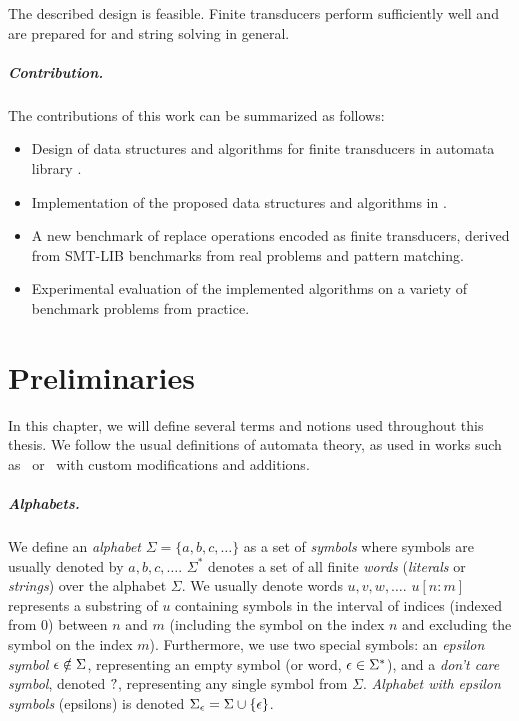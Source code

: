 The described design is feasible.
Finite transducers perform sufficiently well and are prepared for \noodler and string solving in general.

\paragraph{Contribution.}
The contributions of this work can be summarized as follows:
\begin{itemize}
  \item Design of data structures and algorithms for finite transducers in automata library \mata.
  \item Implementation of the proposed data structures and algorithms in \mata.
  \item A new benchmark of replace operations encoded as finite transducers, derived from SMT-LIB benchmarks from real problems and pattern matching.
  \item Experimental evaluation of the implemented algorithms on a variety of benchmark problems from practice.
\end{itemize}

\chapter{Preliminaries}
\label{sec:Preliminaries}
In this chapter, we will define several terms and notions used throughout this thesis.
We follow the usual definitions of automata theory, as used in works such as~\cite{Esparza} or~\cite{Sipser} with custom modifications and additions.

\paragraph{Alphabets.}
We define an \emph{alphabet} $\Sigma = \{ a, b, c, \ldots \}$ as a set of \emph{symbols} where
symbols are usually denoted by $a, b, c, \ldots$.
$\Sigma^*$ denotes a set of all finite \emph{words} (\emph{literals} or \emph{strings}) over the alphabet $\Sigma$.
We usually denote words $u, v, w, \ldots$.
$u[n:m]$ represents a substring of $u$ containing symbols in the interval of indices (indexed from 0) between $n$ and $m$ (including the symbol on the index $n$ and excluding the symbol on the index $m$).
Furthermore, we use two special symbols: an \emph{epsilon symbol} $\epsilon \notin \Sigma$, representing an empty symbol (or word, $\epsilon \in \Sigma^*$), and a \emph{don't care symbol}, denoted $?$, representing any single symbol from $\Sigma$.
\emph{Alphabet with epsilon symbols} (epsilons) is denoted $\Sigma_\epsilon = \Sigma \cup \{ \epsilon \}$.

